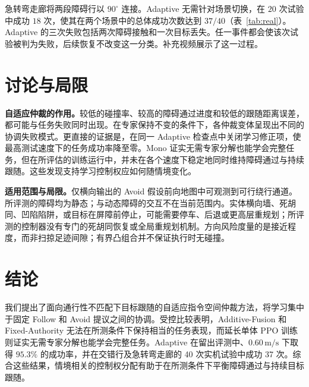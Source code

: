 急转弯走廊将两段障碍行以 $90^\circ$ 连接。Adaptive 无需针对场景切换，在 $20$ 次试验中成功 $18$ 次，使其在两个场景中的总体成功次数达到 $37/40$（表~\ref{tab:real}）。Adaptive 的三次失败包括两次障碍接触和一次目标丢失。任一事件都会使该次试验被判为失败，后续恢复不改变这一分类。补充视频展示了这一过程。




\section{讨论与局限}
\textbf{自适应仲裁的作用。}较低的碰撞率、较高的障碍通过进度和较低的跟随距离误差，都可能与任务失败同时出现。在专家保持不变的条件下，各仲裁变体呈现出不同的协调失败模式。更直接的证据是，在同一 Adaptive 检查点中关闭学习修正项，使最高测试速度下的任务成功率降至零。Mono 证实无需专家分解也能学会完整任务，但在所评估的训练运行中，并未在各个速度下稳定地同时维持障碍通过与持续跟随。这些发现支持学习控制权应如何随情境变化。

\textbf{适用范围与局限。}仅横向输出的 Avoid 假设前向地图中可观测到可行绕行通道。所评测的障碍均为静态；与动态障碍的交互不在当前范围内。实体横向墙、死胡同、凹陷陷阱，或目标在屏障前停止，可能需要停车、后退或更高层重规划；所评测的控制器没有专门的死胡同恢复或全局重规划机制。方向风险度量的是接近程度，而非扫掠足迹间隙；有界凸组合并不保证执行时无碰撞。

\section{结论}
我们提出了面向通行性不匹配下目标跟随的自适应指令空间仲裁方法，将学习集中于固定 Follow 和 Avoid 提议之间的协调。受控比较表明，Additive-Fusion 和 Fixed-Authority 无法在所测条件下保持相当的任务表现，而延长单体 PPO 训练则证实无需专家分解也能学会完整任务。Adaptive 在留出评测中、$0.60\,\mathrm{m/s}$ 下取得 $95.3\%$ 的成功率，并在交错行及急转弯走廊的 40 次实机试验中成功 37 次。综合这些结果，情境相关的控制权分配有助于在所测条件下平衡障碍通过与持续目标跟随。

\FloatBarrier

